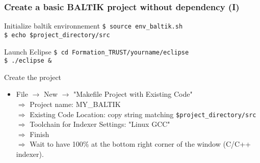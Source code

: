 \documentclass[10pt, hyperref={unicode=true,pdfusetitle, bookmarks=true,bookmarksnumbered=false,bookmarksopen=false, breaklinks=false,pdfborder={0 0 1},backref=true,colorlinks=true,linkcolor=darkblue,pageanchor, urlcolor=darkblue}]{beamer}
\begin{document}


\begin{frame}
\frametitle{Create a basic BALTIK project without dependency (I)}

\begin{block}{Initialize baltik environnement}
 \texttt{\$ source env\_baltik.sh } \\
 \texttt{\$ echo \$project\_directory/src }
\end{block}

\begin{exampleblock}{Launch Eclipse}
\texttt{\$ cd Formation\_TRUST/yourname/eclipse } \\
\texttt{\$ ./eclipse \& }
\end{exampleblock}

\begin{exampleblock}{Create the project}
\begin{itemize}
\item File $\rightarrow$ New $\rightarrow$ "Makefile Project with Existing Code" \\
  $\Rightarrow$ Project name: MY\_BALTIK \\
  $\Rightarrow$ Existing Code Location: copy string matching \texttt{\$project\_directory/src} \\
  $\Rightarrow$ Toolchain for Indexer Settings: "Linux GCC" \\
  $\Rightarrow$ Finish \\
  $\Rightarrow$ Wait to have 100\% at the bottom right corner of the window  (C/C++ indexer).
\end{itemize}
\end{exampleblock}

\end{frame}
\end{document}
